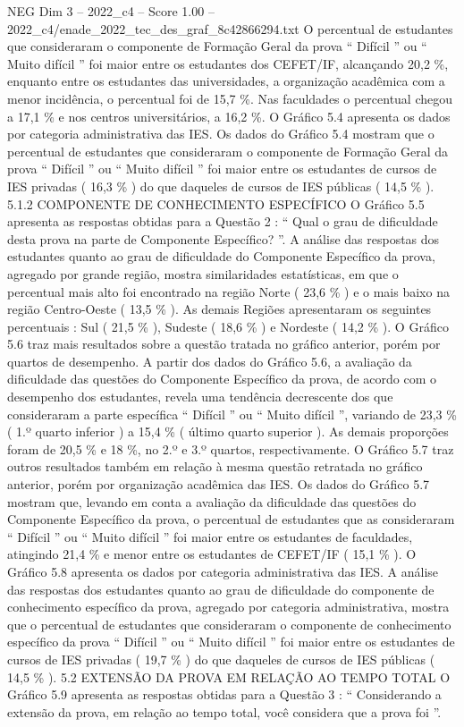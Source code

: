 \begin{textsample}{NEG Dim 3 – 2022\_c4 – Score 1.00 – 2022\_c4/enade\_2022\_tec\_des\_graf\_8c42866294.txt}
O percentual de estudantes que consideraram o componente de Formação Geral da prova “ Difícil ” ou “ Muito difícil ” foi maior entre os estudantes dos CEFET/IF, alcançando 20,2 \%, enquanto entre os estudantes das universidades, a organização acadêmica com a menor incidência, o percentual foi de 15,7 \%.
Nas faculdades o percentual chegou a 17,1 \% e nos centros universitários, a 16,2 \%.
O Gráfico 5.4 apresenta os dados por categoria administrativa das IES.
Os dados do Gráfico 5.4 mostram que o percentual de estudantes que consideraram o componente de Formação Geral da prova “ Difícil ” ou “ Muito difícil ” foi maior entre os estudantes de cursos de IES privadas ( 16,3 \% ) do que daqueles de cursos de IES públicas ( 14,5 \% ). 5.1.2 COMPONENTE DE CONHECIMENTO ESPECÍFICO O Gráfico 5.5 apresenta as respostas obtidas para a Questão 2 : “ Qual o grau de dificuldade desta prova na parte de Componente Específico? ”.
A análise das respostas dos estudantes quanto ao grau de dificuldade do Componente Específico da prova, agregado por grande região, mostra similaridades estatísticas, em que o percentual mais alto foi encontrado na região Norte ( 23,6 \% ) e o mais baixo na região Centro-Oeste ( 13,5 \% ).
As demais Regiões apresentaram os seguintes percentuais : Sul ( 21,5 \% ), Sudeste ( 18,6 \% ) e Nordeste ( 14,2 \% ).
O Gráfico 5.6 traz mais resultados sobre a questão tratada no gráfico anterior, porém por quartos de desempenho.
A partir dos dados do Gráfico 5.6, a avaliação da dificuldade das questões do Componente Específico da prova, de acordo com o desempenho dos estudantes, revela uma tendência decrescente dos que consideraram a parte específica “ Difícil ” ou “ Muito difícil ”, variando de 23,3 \% ( 1.º quarto inferior ) a 15,4 \% ( último quarto superior ).
As demais proporções foram de 20,5 \% e 18 \%, no 2.º e 3.º quartos, respectivamente.
O Gráfico 5.7 traz outros resultados também em relação à mesma questão retratada no gráfico anterior, porém por organização acadêmica das IES.
Os dados do Gráfico 5.7 mostram que, levando em conta a avaliação da dificuldade das questões do Componente Específico da prova, o percentual de estudantes que as consideraram “ Difícil ” ou “ Muito difícil ” foi maior entre os estudantes de faculdades, atingindo 21,4 \% e menor entre os estudantes de CEFET/IF ( 15,1 \% ).
O Gráfico 5.8 apresenta os dados por categoria administrativa das IES.
A análise das respostas dos estudantes quanto ao grau de dificuldade do componente de conhecimento específico da prova, agregado por categoria administrativa, mostra que o percentual de estudantes que consideraram o componente de conhecimento específico da prova “ Difícil ” ou “ Muito difícil ” foi maior entre os estudantes de cursos de IES privadas ( 19,7 \% ) do que daqueles de cursos de IES públicas ( 14,5 \% ). 5.2 EXTENSÃO DA PROVA EM RELAÇÃO AO TEMPO TOTAL O Gráfico 5.9 apresenta as respostas obtidas para a Questão 3 : “ Considerando a extensão da prova, em relação ao tempo total, você considera que a prova foi ”.

\end{textsample}
